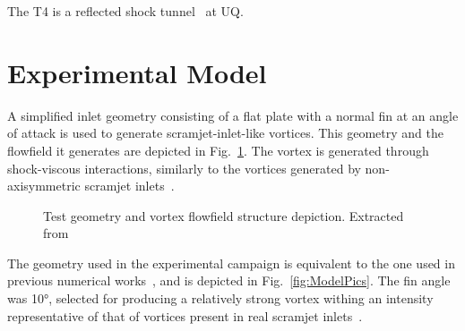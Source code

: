 \documentclass{AIAA}
\begin{document}
The T4 is a reflected shock tunnel~\cite{Stalker1965} at UQ.
%


\section{Experimental Model}
	\label{sec:ModelDescription}
	
A simplified inlet geometry consisting of a flat plate with a normal fin at an angle of attack is used to generate scramjet-inlet-like vortices. This geometry and the flowfield it generates are depicted in Fig.~\ref{fig:Vortex_Sketches}. The vortex is generated through shock-viscous interactions, similarly to the vortices generated by non-axisymmetric scramjet inlets~\cite{Llobet_PlumeElongation,AFMCpaper2014}.
\begin{figure}[h]
\center
\caption{Test geometry and vortex flowfield structure depiction. Extracted from~\cite{JSASS_paper}}  
\label{fig:Vortex_Sketches}	
\end{figure}

The geometry used in the experimental campaign is equivalent to the one used in previous numerical works~\cite{SpacePlanes_paper2015,AFMCpaper2014,JSASS_paper,Llobet_PlumeElongation}, and is depicted in Fig.~\ref{fig:ModelPics}. The fin angle was \ang{10}, selected for producing a relatively strong vortex withing an intensity representative of that of vortices present in real scramjet inlets~\cite{AFMCpaper2014,SpacePlanes_paper2015}.
\end{document}
